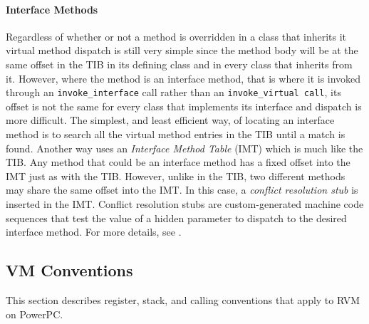 \paragraph{Interface Methods}
Regardless of whether or not a method is overridden in a class that inherits it
virtual method dispatch is still very simple since the method body will be at
the same offset in the TIB in its defining class and in every class that 
inherits from it. 
However, where the method is an interface method, 
that is where it is invoked through an {\tt invoke\_interface} call rather than
an {\tt invoke\_virtual call}, its offset is not the same for every class that 
implements its interface and dispatch is more difficult.
The simplest, and least efficient way, of locating an interface method 
is to search all the virtual method entries in the TIB until a match is found.
Another way uses an {\em Interface Method Table} (IMT) which is much like the 
TIB. Any method that could be an interface method has a fixed offset into the 
IMT just as with the TIB. However, unlike in the TIB, two different methods may
share the same offset into the IMT. In this case, a {\em conflict resolution
stub} is inserted in the IMT. Conflict resolution stubs are
custom-generated machine code sequences that test the value of a
hidden parameter to dispatch to the desired interface method.
For more details, see
.

\subsection{VM Conventions}

 \label{aix-conventions}
 \label{aix-conventions}


This section describes register, stack, and calling conventions that apply to 
RVM on PowerPC\PowerPCTMFootnote.

